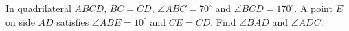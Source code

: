 In quadrilateral $ABCD$, $BC=CD$, $\angle ABC=70^\circ$ and $\angle BCD=170^\circ$. A point $E$ on side $AD$ satisfies $\angle ABE=10^\circ$ and $CE=CD$. Find $\angle BAD$ and $\angle ADC$.
